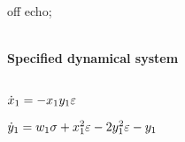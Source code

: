 
off echo;

\(\)
\paragraph{Specified dynamical system}
\(
\)\par
\(\dot x_{1}=-x_{1} y_{1} \varepsilon
\)\par
\(\dot y_{1}=w_{1} \sigma +x_{1}^{2} \varepsilon-2 y_{1}^{2} \varepsilon-y_{1}
\)\par
